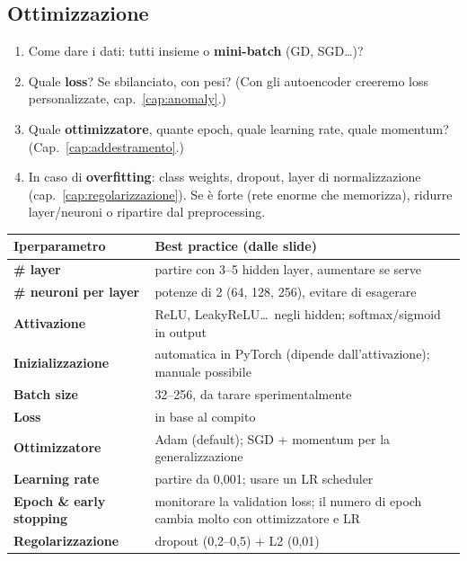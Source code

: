 \subsection{Ottimizzazione}
\begin{enumerate}[resume]
  \item Come dare i dati: tutti insieme o \textbf{mini-batch} (GD, SGD\ldots)?
  \item Quale \textbf{loss}? Se sbilanciato, con pesi? (Con gli autoencoder creeremo loss personalizzate, cap.~\ref{cap:anomaly}.)
  \item Quale \textbf{ottimizzatore}, quante epoch, quale learning rate, quale momentum? (Cap.~\ref{cap:addestramento}.)
  \item In caso di \textbf{overfitting}: class weights, dropout, layer di normalizzazione (cap.~\ref{cap:regolarizzazione}).
        Se è forte (rete enorme che memorizza), ridurre layer/neuroni o ripartire dal preprocessing.
\end{enumerate}

\begin{center}
\small
\renewcommand{\arraystretch}{1.2}
\begin{tabularx}{\textwidth}{>{\bfseries}l X}
\toprule
Iperparametro & Best practice (dalle slide)\\
\midrule
\# layer & partire con 3--5 hidden layer, aumentare se serve\\
\# neuroni per layer & potenze di 2 (64, 128, 256), evitare di esagerare\\
Attivazione & ReLU, LeakyReLU\ldots\ negli hidden; softmax/sigmoid in output\\
Inizializzazione & automatica in PyTorch (dipende dall'attivazione); manuale possibile\\
Batch size & 32--256, da tarare sperimentalmente\\
Loss & in base al compito\\
Ottimizzatore & Adam (default); SGD + momentum per la generalizzazione\\
Learning rate & partire da 0,001; usare un LR scheduler\\
Epoch \& early stopping & monitorare la validation loss; il numero di epoch cambia molto con ottimizzatore e LR\\
Regolarizzazione & dropout (0,2--0,5) + L2 (0,01)\\
\bottomrule
\end{tabularx}
\end{center}


